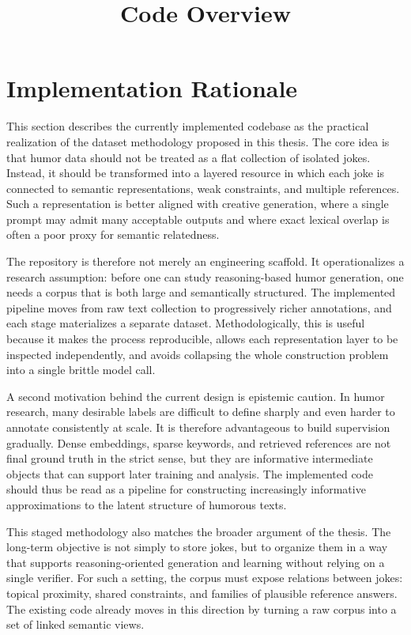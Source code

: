\documentclass[11pt]{article}
\title{Code Overview}
\author{}
\date{}
\begin{document}
\maketitle

\section{Implementation Rationale}

This section describes the currently implemented codebase as the practical realization of the dataset methodology proposed in this thesis. The core idea is that humor data should not be treated as a flat collection of isolated jokes. Instead, it should be transformed into a layered resource in which each joke is connected to semantic representations, weak constraints, and multiple references. Such a representation is better aligned with creative generation, where a single prompt may admit many acceptable outputs and where exact lexical overlap is often a poor proxy for semantic relatedness.

The repository is therefore not merely an engineering scaffold. It operationalizes a research assumption: before one can study reasoning-based humor generation, one needs a corpus that is both large and semantically structured. The implemented pipeline moves from raw text collection to progressively richer annotations, and each stage materializes a separate dataset. Methodologically, this is useful because it makes the process reproducible, allows each representation layer to be inspected independently, and avoids collapsing the whole construction problem into a single brittle model call.

A second motivation behind the current design is epistemic caution. In humor research, many desirable labels are difficult to define sharply and even harder to annotate consistently at scale. It is therefore advantageous to build supervision gradually. Dense embeddings, sparse keywords, and retrieved references are not final ground truth in the strict sense, but they are informative intermediate objects that can support later training and analysis. The implemented code should thus be read as a pipeline for constructing increasingly informative approximations to the latent structure of humorous texts.

This staged methodology also matches the broader argument of the thesis. The long-term objective is not simply to store jokes, but to organize them in a way that supports reasoning-oriented generation and learning without relying on a single verifier. For such a setting, the corpus must expose relations between jokes: topical proximity, shared constraints, and families of plausible reference answers. The existing code already moves in this direction by turning a raw corpus into a set of linked semantic views.
\end{document}
